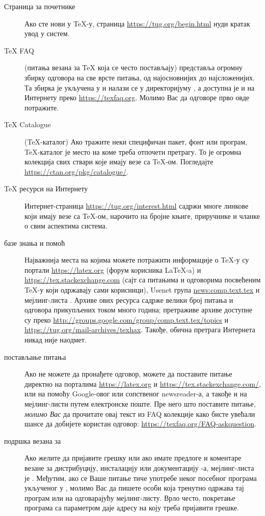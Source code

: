\documentclass{article}
\begin{document}
\begin{description}
\item [Страница за почетнике] Ако сте нови у \TeX-у, страница
\url{https://tug.org/begin.html} нуди кратак увод у систем.

\item [\TeX{} FAQ] (питања везана за \TeX{} која се често
постављају) представља огромну збирку одговора на све врсте питања,
од најосновнијих до најсложенијих. Та збирка је укључена у \TL{} и
налази се у директоријуму
, а доступна је и
на Интернету преко \url{https://texfaq.org}. Молимо Вас да
одговоре прво овде потражите.

\item [\TeX{} Catalogue] (\TeX{}-каталог) Ако тражите неки специфичан
пакет, фонт или програм, \TeX{}-каталог је место на коме треба
отпочети претрагу. То је огромна колекција свих ствари које имају
везе са \TeX{}-ом. Погледајте
\url{https://ctan.org/pkg/catalogue/}.

\item [\TeX{} ресурси на Интернету] Интернет-страница
\url{https://tug.org/interest.html} садржи многе линкове који имају
везе са \TeX{}-ом, нарочито на бројне књиге, приручнике и чланке о
свим аспектима система.

\item [базе знања и помоћ] Најважнија места на којима можете потражити
  информације о \TeX-у су портали \url{https://latex.org} (форум корисника
  \LaTeX{}-a) и \url{https://tex.stackexchange.com} (сајт са питањима и 
  одговорима посвећеним \TeX-у који одржавају сами корисници),
  Usenet група \url{news:comp.text.tex} и мејлинг-листа
  .
  Архиве ових ресурса садрже велики број питања и одговора
  прикупљених током много година; претраживе архиве доступне
  су преко \url{http://groups.google.com/group/comp.text.tex/topics} и
  \url{https://tug.org/mail-archives/texhax}. Такође, обична претрага
  Интернета никад није наодмет.

\item [постављање питања] Ако не можете да пронађете одговор,
  можете да поставите питање директно на порталима
  \url{https://latex.org} и \url{https://tex.stackexchange.com/},
  или на  помоћу
  Google-овог или сопственог newsreader-а, а такође и на мејлинг-листи
   путем електронске поште. Пре него што поставите 
  питање, \emph{молимо Вас} да прочитате овај текст из FAQ колекције 
  како бисте увећали шансе да добијете користан одговор:
  \url{https://texfaq.org/FAQ-askquestion}.

\item [подршка везана за \TL{}] Ако желите да пријавите грешку или
  ако имате предлоге и коментаре везане за дистрибуцију, инсталацију
  или документацију \TL{}-а, мејлинг-листа је .
  Међутим, ако се Ваше питање тиче употребе неког посебног програма
  укљученог у \TL{}, молимо Вас да пишете особи која тренутно одржава
  тај програм или на одговарајућу мејлинг-листу. Врло често, покретање
  програма са параметром  даје адресу на коју треба
  пријавити грешке.

\end{description}
\end{document}
